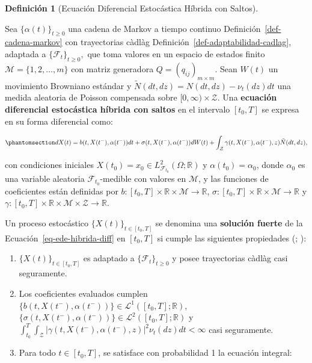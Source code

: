 \documentclass[
  spanish,
  us-letterpaper,
]{scrreprt}
\providecommand{\tightlist}{%
  \setlength{\itemsep}{0pt}\setlength{\parskip}{0pt}}
\numberwithin{equation}{section}
\theoremstyle{plain}
\theoremstyle{plain}
\theoremstyle{plain}
\theoremstyle{definition}
\newtheorem{definition}{Definición}[chapter]
\theoremstyle{remark}
\begin{document}
\begin{definition}[Ecuación Diferencial Estocástica Híbrida con
Saltos]\protect\hypertarget{def-ede-hibrida}{}\label{def-ede-hibrida}

Sea \(\{\alpha(t)\}_{t \ge 0}\) una cadena de Markov a tiempo continuo
Definición~\ref{def-cadena-markov} con trayectorias càdlàg
Definición~\ref{def-adaptabilidad-cadlag}, adaptada a
\(\{\mathcal{F}_t\}_{t \ge 0},\) que toma valores en un espacio de
estados finito \(\mathcal{M} = \{1, 2, \dots, m\}\) con matriz
generadora \(Q = (q_{ij})_{m \times m}.\) Sean \(W(t)\) un movimiento
Browniano estándar y \(\tilde{N}(dt, dz) = N(dt, dz) - \nu_t(dz)dt\) una
medida aleatoria de Poisson compensada sobre
\([0, \infty) \times \mathcal{Z}.\) Una \textbf{ecuación diferencial
estocástica híbrida con saltos} en el intervalo \([t_0, T]\) se expresa
en su forma diferencial como:

\begin{equation}\phantomsection\label{eq-ede-hibrida-diff}{
dX(t) = b(t, X(t^-), \alpha(t^-)) dt + \sigma(t, X(t^-), \alpha(t^-)) dW(t) + \int_{\mathcal{Z}} \gamma(t, X(t^-), \alpha(t^-), z) \tilde{N}(dt, dz),
}\end{equation}

con condiciones iniciales
\(X(t_0) = x_0 \in L^2_{\mathcal{F}_{t_0}}(\Omega; \mathbb{R})\) y
\(\alpha(t_0) = \alpha_0\), donde \(\alpha_0\) es una variable aleatoria
\(\mathcal{F}_{t_0}\)-medible con valores en \(\mathcal{M}\), y las
funciones de coeficientes están definidas por
\(b: [t_0, T] \times \mathbb{R} \times \mathcal{M} \to \mathbb{R}\),
\(\sigma: [t_0, T] \times \mathbb{R} \times \mathcal{M} \to \mathbb{R}\)
y
\(\gamma: [t_0, T] \times \mathbb{R} \times \mathcal{M} \times \mathcal{Z} \to \mathbb{R}\).

Un proceso estocástico \(\{X(t)\}_{t \in [t_0, T]}\) se denomina una
\textbf{solución fuerte} de la Ecuación~\ref{eq-ede-hibrida-diff} en
\([t_0, T]\) si cumple las siguientes propiedades
(;
):

\begin{enumerate}
\def\labelenumi{\arabic{enumi}.}
\tightlist
\item
  \(\{X(t)\}_{t \in [t_0, T]}\) es adaptado a
  \(\{\mathcal{F}_t\}_{t \ge 0}\) y posee trayectorias càdlàg casi
  seguramente.
\item
  Los coeficientes evaluados cumplen
  \(\{b(t, X(t^-), \alpha(t^-))\} \in \mathcal{L}^1([t_0, T]; \mathbb{R})\),
  \(\{\sigma(t, X(t^-), \alpha(t^-))\} \in \mathcal{L}^2([t_0, T]; \mathbb{R})\)
  y
  \(\displaystyle \int_{t_0}^T \int_{\mathcal{Z}} \vert \gamma(t, X(t^-), \alpha(t^-), z) \vert^2 \nu_t(dz) dt < \infty\)
  casi seguramente.
\item
  Para todo \(t \in [t_0, T]\), se satisface con probabilidad 1 la
  ecuación integral:
\end{enumerate}


\end{definition}
\end{document}
